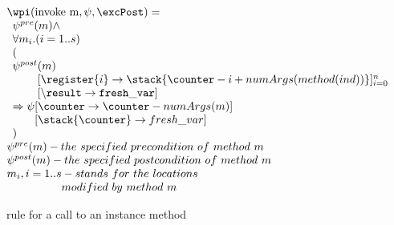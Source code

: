 \begin{figure}[!ht]
$$
\begin{array}{l}
\wpi(\rm{invoke} \ m, \psi ,\excPost) =\\ 
\begin{array}{l}
\psi^{pre}(m) \wedge \\
 \forall m_{i}. ( i = 1 .. s ) \\
 ( \\
\psi^{post}(m) \\
\phantom{\psi^{post}}[\register{i}  \rightarrow \stack{\counter - i + numArgs(method(ind) ) } ]_{i=0}^n  \\
\phantom{\psi^{post}} [\tt{\backslash result} \rightarrow fresh\_var] \\
\Rightarrow \psi[\counter \rightarrow \counter - numArgs(m)]\\
\phantom{\Rightarrow \psi} [\stack{\counter }  \rightarrow fresh\_var] \\
) \\
\end{array} \\
\psi^{pre}(m) - the \ specified \ precondition \ of \ method \ m \\
\psi^{post}(m) - the \ specified \ postcondition \ of \ method \ m \\
m_{i} , i = 1 .. s - stands  \ for \ the \ locations \\
\phantom{m_{i} , i = 1 .. s   } modified \ by \ method \ m
\end{array}
$$
\caption{\wpi \ rule for a call to an instance method}
\label{wpInv}
\end{figure}
